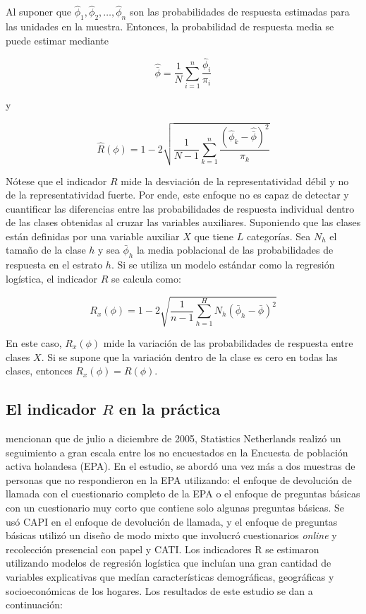 \documentclass[
  10pt,
  spanish,
]{book}
\begin{document}
Al suponer que \(\hat{\phi}_{1},\hat{\phi}_{2},\ldots,\hat{\phi}_{n}\) son
las probabilidades de respuesta estimadas para las unidades en la muestra.
Entonces, la probabilidad de respuesta media se puede estimar mediante

\[
\hat{\bar{\phi}}  =  \frac{1}{N}\sum_{i=1}^{n}\frac{\hat{\phi}_{i}}{\pi_{i}}
\]

y

\[
\hat{R}\left(\phi\right)  =  1-2\sqrt{\frac{1}{N-1}\sum_{k=1}^{n}\frac{\left(\hat{\phi}_{k}-\hat{\bar{\phi}}\right)^{2}}{\pi_{k}}}
\]

Nótese que el indicador \(R\) mide la desviación de la representatividad débil y no de la representatividad fuerte. Por ende, este enfoque no es capaz de detectar y cuantificar las diferencias
entre las probabilidades de respuesta individual dentro de las clases obtenidas al cruzar las variables auxiliares. Suponiendo que las clases están definidas por una variable auxiliar \(X\) que tiene \(L\) categorías. Sea \(N_{h}\) el tamaño de la clase \(h\) y sea \(\bar{\phi}_{h}\) la media poblacional de las probabilidades de respuesta en el estrato \(h\). Si se utiliza un modelo estándar como la regresión logística, el indicador \(R\) se calcula como:

\[
R_{x}\left(\phi\right)  =  1-2\sqrt{\frac{1}{n-1}\sum_{h=1}^{H}N_{h}\left(\bar{\phi}_{h}-\bar{\phi}\right)^{2}}
\]

En este caso, \(R_{x}\left(\phi\right)\) mide la variación de las probabilidades de respuesta entre clases \(X\). Si se supone que la variación dentro de la clase es cero en todas las clases, entonces \(R_{x}\left(\phi\right) = R\left(\phi\right)\).

\hypertarget{el-indicador-r-en-la-pruxe1ctica}{%
\subsection{\texorpdfstring{El indicador \(R\) en la práctica}{El indicador R en la práctica}}\label{el-indicador-r-en-la-pruxe1ctica}}

\citet{Bethlehem_Cobben_Schouten_2009} mencionan que de julio a diciembre de 2005, Statistics Netherlands realizó un seguimiento a gran escala entre los no encuestados en la Encuesta de población activa holandesa (EPA). En el estudio, se abordó una vez más a dos muestras de personas
que no respondieron en la EPA utilizando: el enfoque de devolución
de llamada con el cuestionario completo de la EPA o el enfoque de preguntas básicas con un cuestionario muy corto que contiene solo algunas preguntas
básicas. Se usó CAPI en el enfoque de devolución de llamada, y el enfoque de preguntas básicas utilizó un diseño de modo mixto que involucró cuestionarios \emph{online} y recolección presencial con papel y CATI. Los indicadores R se estimaron utilizando modelos de regresión logística que incluían una gran cantidad de variables explicativas que medían características demográficas, geográficas y socioeconómicas
de los hogares. Los resultados de este estudio se dan a continuación:
\end{document}
